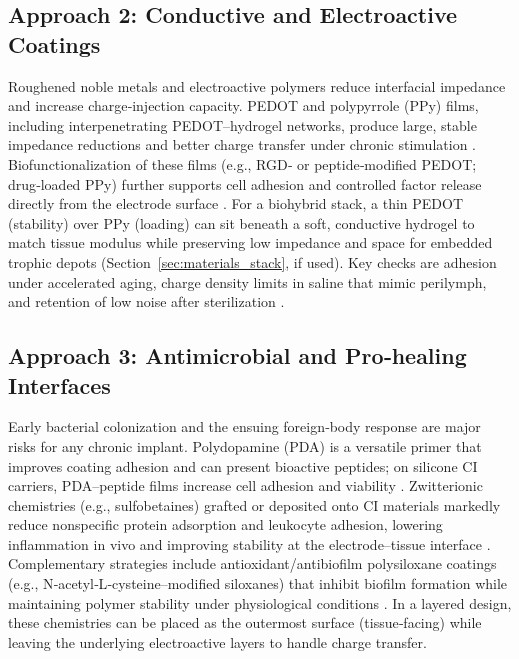 \subsection{Approach 2: Conductive and Electroactive Coatings}
Roughened noble metals and electroactive polymers reduce interfacial impedance and increase charge‑injection capacity. PEDOT and polypyrrole (PPy) films, including interpenetrating PEDOT–hydrogel networks, produce large, stable impedance reductions and better charge transfer under chronic stimulation \cite{Venkatraman2011-ql,Goding2017,Dalrymple2020,ABIDIAN20081273}. Biofunctionalization of these films (e.g., RGD‑ or peptide‑modified PEDOT; drug‑loaded PPy) further supports cell adhesion and controlled factor release directly from the electrode surface \cite{Chikar2012}. For a biohybrid stack, a thin PEDOT (stability) over PPy (loading) can sit beneath a soft, conductive hydrogel to match tissue modulus while preserving low impedance and space for embedded trophic depots (Section~\ref{sec:materials_stack}, if used). Key checks are adhesion under accelerated aging, charge density limits in saline that mimic perilymph, and retention of low noise after sterilization \cite{Venkatraman2011-ql,Dalrymple2020}.

\subsection{Approach 3: Antimicrobial and Pro‑healing Interfaces}
Early bacterial colonization and the ensuing foreign‑body response are major risks for any chronic implant. Polydopamine (PDA) is a versatile primer that improves coating adhesion and can present bioactive peptides; on silicone CI carriers, PDA–peptide films increase cell adhesion and viability \cite{Schendzielorz2017}. Zwitterionic chemistries (e.g., sulfobetaines) grafted or deposited onto CI materials markedly reduce nonspecific protein adsorption and leukocyte adhesion, lowering inflammation in vivo and improving stability at the electrode–tissue interface \cite{Horne2023,Chen2023-ba}. Complementary strategies include antioxidant/antibiofilm polysiloxane coatings (e.g., N‑acetyl‑L‑cysteine–modified siloxanes) that inhibit biofilm formation while maintaining polymer stability under physiological conditions \cite{Cozma2021-jb}. In a layered design, these chemistries can be placed as the outermost surface (tissue‑facing) while leaving the underlying electroactive layers to handle charge transfer.

